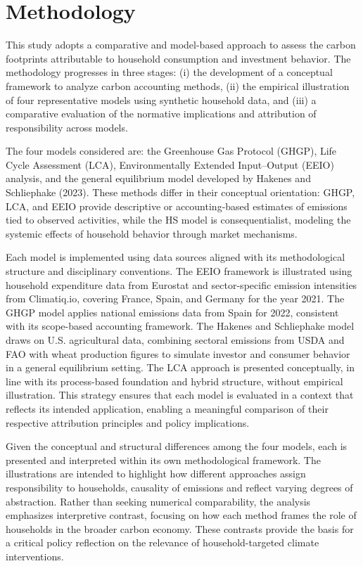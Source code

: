 \documentclass[12pt,a4paper]{article}%
\begin{document}
\section{Methodology}

This study adopts a comparative and model-based approach to assess the carbon footprints attributable to household consumption and investment behavior. The methodology progresses in three stages: (i) the development of a conceptual framework to analyze carbon accounting methods, (ii) the empirical illustration of four representative models using synthetic household data, and (iii) a comparative evaluation of the normative implications and attribution of responsibility across models. 

The four models considered are: the Greenhouse Gas Protocol (GHGP), Life Cycle Assessment (LCA), Environmentally Extended Input–Output (EEIO) analysis, and the general equilibrium model developed by Hakenes and Schliephake (2023). These methods differ in their conceptual orientation: GHGP, LCA, and EEIO provide descriptive or accounting-based estimates of emissions tied to observed activities, while the HS model is consequentialist, modeling the systemic effects of household behavior through market mechanisms. 

Each model is implemented using data sources aligned with its methodological structure and disciplinary conventions. The EEIO framework is illustrated using household expenditure data from Eurostat and sector-specific emission intensities from Climatiq.io, covering France, Spain, and Germany for the year 2021. The GHGP model applies national emissions data from Spain for 2022, consistent with its scope-based accounting framework. The Hakenes and Schliephake model draws on U.S. agricultural data, combining sectoral emissions from USDA and FAO with wheat production figures to simulate investor and consumer behavior in a general equilibrium setting. The LCA approach is presented conceptually, in line with its process-based foundation and hybrid structure, without empirical illustration. This strategy ensures that each model is evaluated in a context that reflects its intended application, enabling a meaningful comparison of their respective attribution principles and policy implications.

Given the conceptual and structural differences among the four models, each is presented and interpreted within its own methodological framework. The illustrations are intended to highlight how different approaches assign responsibility to households, causality of emissions and reflect varying degrees of abstraction. Rather than seeking numerical comparability, the analysis emphasizes interpretive contrast, focusing on how each method frames the role of households in the broader carbon economy. These contrasts provide the basis for a critical policy reflection on the relevance of household-targeted climate interventions.
\end{document}
